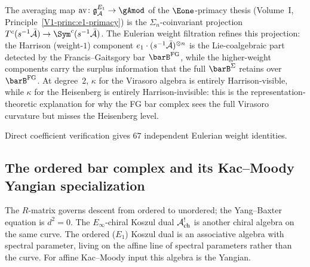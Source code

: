 \begin{remark}
The averaging map $\mathrm{av}\colon \mathfrak{g}_\cA^{E_1} \to \gAmod$ of
the $\Eone$-primacy thesis
(Volume~I, Principle~\textup{\ref*{V1-princ:e1-primacy}})
is the $\Sigma_n$-coinvariant projection
$T^c(s^{-1}\bar\cA) \to \Sym^c(s^{-1}\bar\cA)$.
The Eulerian weight filtration refines this projection:
the Harrison (weight-$1$) component
$e_1 \cdot (s^{-1}\bar{\mathcal{A}})^{\otimes n}$ is the Lie-coalgebraic
part detected by the Francis--Gaitsgory bar $\barB^{\mathrm{FG}}$,
while the higher-weight components carry the surplus information
that the full $\barB^{\Sigma}$ retains over $\barB^{\mathrm{FG}}$.
At degree~$2$, $\kappa$ for the Virasoro algebra is entirely
Harrison-visible, while $\kappa$ for the Heisenberg is entirely
Harrison-invisible: this is the representation-theoretic
explanation for why the FG bar complex sees the full Virasoro
curvature but misses the Heisenberg level.

Direct coefficient verification gives $67$ independent Eulerian
weight identities.
\end{remark}

\subsection{The ordered bar complex and its Kac--Moody Yangian specialization}
\label{subsec:dg-shifted-yangian-from-bar}

The $R$-matrix governs descent from ordered to unordered; the
Yang--Baxter equation is $d^2=0$. The $E_\infty$-chiral Koszul dual
$\mathcal{A}^!_{\mathrm{ch}}$ is another chiral algebra on the same curve.
The ordered ($E_1$) Koszul dual is an associative algebra with
spectral parameter, living on the affine line of spectral
parameters rather than the curve. For affine Kac--Moody input this
algebra is the Yangian.


